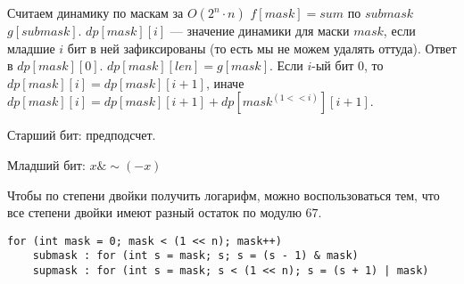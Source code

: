 Считаем динамику по маскам за $O(2^n \cdot n)$ $f[mask] = sum$ по $submask$ $g[submask]$.
$dp[mask][i]$ --- значение динамики для маски $mask$, если младшие $i$ бит в ней зафиксированы (то есть мы не можем удалять оттуда).
Ответ в $dp[mask][0]$.
$dp[mask][len] = g[mask]$.
Если $i$-ый бит 0, то $dp[mask][i] = dp[mask][i + 1]$, иначе $dp[mask][i] = dp[mask][i + 1] + dp[mask ^ (1 << i)][i + 1]$.

Старший бит: предподсчет.
 
Младший бит: $x \& \sim (-x)$ 

Чтобы по степени двойки получить логарифм, можно воспользоваться тем, что все степени двойки имеют разный остаток по модулю $67$.

\begin{verbatim}
for (int mask = 0; mask < (1 << n); mask++)
	submask : for (int s = mask; s; s = (s - 1) & mask)
	supmask : for (int s = mask; s < (1 << n); s = (s + 1) | mask)
\end{verbatim}


